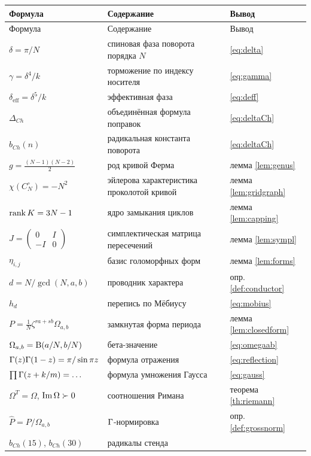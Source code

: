 \begin{center}
\small
\begin{longtable}{@{}p{3.2cm} p{8.2cm} p{2.6cm}@{}}
\toprule
Формула & Содержание & Вывод \\
\midrule
\endfirsthead
\toprule
Формула & Содержание & Вывод \\
\midrule
\endhead
\bottomrule
\endfoot
$\delta=\pi/N$ & спиновая фаза поворота порядка $N$ &
\eqref{eq:delta} \\
$\gamma=\delta^4/k$ & торможение по индексу носителя &
\eqref{eq:gamma} \\
$\delta_{\mathrm{eff}}=\delta^5/k$ & эффективная фаза &
\eqref{eq:deff} \\
$\Delta_{Ch}$ & объединённая формула поправок & \eqref{eq:deltaCh} \\
$b_{Ch}(n)$ & радикальная константа поворота & \eqref{eq:deltaCh} \\
$g=\tfrac{(N-1)(N-2)}2$ & род кривой Ферма & лемма
\ref{lem:genus} \\
$\chi(C_N^\circ)=-N^2$ & эйлерова характеристика проколотой кривой &
лемма \ref{lem:gridgraph} \\
$\operatorname{rank} K=3N-1$ & ядро замыкания циклов & лемма \ref{lem:capping} \\
$J=\begin{pmatrix}0&I\\-I&0\end{pmatrix}$ & симплектическая матрица
пересечений & лемма \ref{lem:sympl} \\
$\eta_{i,j}$ & базис голоморфных форм & лемма \ref{lem:forms} \\
$d=N/\gcd(N,a,b)$ & проводник характера & опр. \ref{def:conductor} \\
$h_d$ & перепись по Мёбиусу & \eqref{eq:mobius} \\
$P=\tfrac1N\zeta^{ra+sb}\Omega_{a,b}$ & замкнутая форма периода &
лемма \ref{lem:closedform} \\
$\Omega_{a,b}=\mathrm{B}(a/N,b/N)$ & бета-значение & \eqref{eq:omegaab} \\
$\Gamma(z)\Gamma(1-z)=\pi/\sin\pi z$ & формула отражения &
\eqref{eq:reflection} \\
$\prod\Gamma(z+k/m)=\dots$ & формула умножения Гаусса &
\eqref{eq:gauss} \\
$\Omega^{T}=\Omega$, $\operatorname{Im}\Omega\succ0$ & соотношения Римана &
теорема \ref{th:riemann} \\
$\widehat P=P/\Omega_{a,b}$ & $\Gamma$-нормировка & опр.
\ref{def:grossnorm} \\
$b_{Ch}(15)$, $b_{Ch}(30)$ & радикалы стенда &

\end{longtable}
\end{center}
